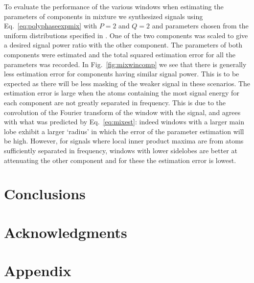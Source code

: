 \documentclass[twoside,a4paper]{article}
\begin{document}
To evaluate the performance of the various windows when estimating the
parameters of components in mixture we synthesized signals using
Eq.~\ref{eq:polyphaseexpmix} with $P=2$ and $Q=2$ and parameters chosen from the
uniform distributions specified in \cite{betser2009sinusoidal}. One of the two
components was scaled to give a desired signal power ratio with the other
component. The parameters of both components were estimated and the total
squared estimation error for all the parameters was recorded. In
Fig.~\ref{fig:mixwincomp} we see that there is generally less estimation error
for components having similar signal power. This is to be expected as there will
be less masking of the weaker signal in these scenarios. The estimation error is
large when the atoms containing the most signal energy for each component are
not greatly separated in frequency. This is due to the convolution of the
Fourier transform of the window with the signal, and agrees with what was
predicted by Eq.~\ref{eq:mixest}: indeed windows with a larger main lobe exhibit
a larger `radius' in which the error of the parameter estimation will be high.
However, for signals where local inner product maxima are from atoms sufficiently
separated in frequency, windows with lower sidelobes are better at attenuating
the other component and for these the estimation error is lowest.

\section{Conclusions}

\section{Acknowledgments}



\section{Appendix}
\end{document}
